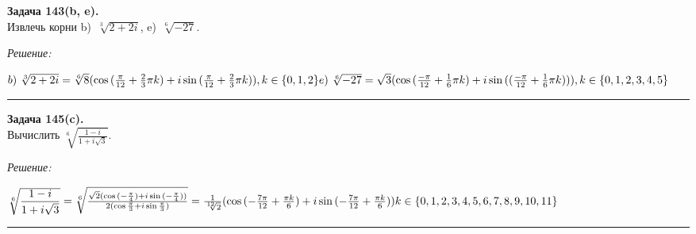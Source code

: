 \documentclass[a4paper, 12pt]{article} %
\newenvironment{problem}[2][Задача]
    { \begin{mdframed}[backgroundcolor=gray!10] \textbf{#1 #2.} \\}
    {  \end{mdframed}}
\newenvironment{solution}
    {\textit{Решение: }}
    {\noindent\rule{7in}{1.5pt}}
\begin{document}
\begin{problem}{143(b, e)}
Извлечь корни b)~$\sqrt[3]{2+2i}$, e)~$\sqrt[6]{-27}$.
\end{problem}
\begin{solution}

$
b)~\sqrt[3]{2 + 2i} = \sqrt[6]{8}(\cos{(\frac{\pi}{12} + \frac{2}{3}\pi k)} + i\sin{(\frac{\pi}{12} + \frac{2}{3}\pi k)}), k \in \{0, 1, 2\}
\\
e)~\sqrt[6]{-27} = \sqrt3(\cos{(\frac{-\pi}{12} + \frac{1}{6}\pi k)} + i\sin{((\frac{-\pi}{12} + \frac{1}{6}\pi k))}), k \in \{0, 1, 2, 3, 4, 5\}
$

\end{solution}

\begin{problem}{145(c)}
Вычислить $\sqrt[6]{\displaystyle\frac{1-i}{1+i\sqrt{3}}}$.
\end{problem}
\begin{solution}

$
\sqrt[6]{\displaystyle\frac{1-i}{1+i\sqrt{3}}} =
\sqrt[6]{\frac{\sqrt2(\cos{(-\frac{\pi}{4})} + i\sin{(-\frac{\pi}{4})})}{2(\cos{\frac{\pi}{3}} + i\sin{\frac{\pi}{3}})}} =
\frac{1}{\sqrt[12]{2}}(\cos{(-\frac{7\pi}{12} + \frac{\pi k}{6})} + i\sin{(-\frac{7\pi}{12} + \frac{\pi k}{6})}) \\
k \in \{0, 1, 2, 3, 4, 5, 6, 7, 8, 9, 10, 11\}
$

\end{solution}
\end{document}
